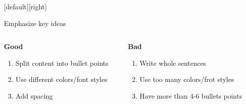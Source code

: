 \documentclass{beamer}
\begin{document}
{
\setcounter{framenumber}{14}
[default][right]
\begin{frame}{{\color{white}Emphasize key ideas}}
\begin{columns}
\begin{column}{.5\linewidth}
\begin{spacing}{1.5}
\begin{center}
\textbf{Good}
\end{center}
\begin{enumerate}[\color{black}$\bullet$]
\item Split content into bullet points
\item Use different colors/font styles
\item Add spacing
\end{enumerate}
\end{spacing}
\end{column}

\begin{column}{.55\linewidth}
\begin{spacing}{1.5}
\begin{center}
\textbf{Bad}
\end{center}	
\begin{enumerate}[\color{black}$\bullet$]
\item Write whole sentences
\item Use too many colors/frot styles
\item Have more than 4-6 bullets points
\end{enumerate}
\end{spacing}
\end{column}
\end{columns}
\end{frame}
}
\end{document}
